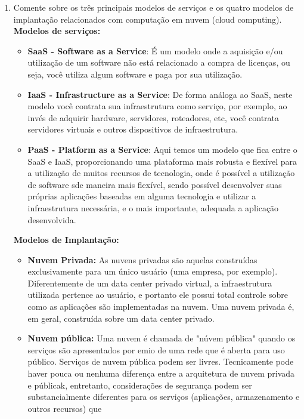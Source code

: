 \documentclass[10pt]{article}
\begin{document}
\begin{enumerate}
    \item Comente sobre os três principais modelos de serviços e os quatro modelos
    de implantação relacionados com computação em nuvem (cloud computing).
    \textbf{Modelos de serviços: }
    \begin{itemize}
        \item \textbf{SaaS - Software as a Service}:
        É um modelo onde a aquisição e/ou utilização de um software não está 
        relacionado a compra de licenças, ou seja, você utiliza algum software e 
        paga por sua utilização. 
        \item \textbf{IaaS - Infrastructure as a Service}:
        De forma análoga ao SaaS, neste modelo você contrata sua infraestrutura
        como serviço, por exemplo, ao invés de adquirir hardware, servidores,
        roteadores, etc, você contrata servidores virtuais e outros dispositivos
        de infraestrutura.
        \item \textbf{PaaS - Platform as a Service}:
        Aqui temos um modelo que fica entre o SaaS e IaaS, proporcionando uma
        plataforma mais robusta e flexível para a utilização de muitos recursos
        de tecnologia, onde é possível a utilização de software sde maneira mais 
        flexível, sendo possível desenvolver suas próprias aplicações baseadas
        em alguma tecnologia e utilizar a infraestrutura necessária, e o mais
        importante, adequada a aplicação desenvolvida.
    \end{itemize}
    \textbf{Modelos de Implantação:}
    \begin{itemize}
        \item \textbf{Nuvem Privada:} As nuvens privadas são aquelas construídas
        exclusivamente para um único usuário (uma empresa, por exemplo). 
        Diferentemente de um data center privado virtual, a infraestrutura utilizada
        pertence ao usuário, e portanto ele possui total controle sobre como as 
        aplicações são implementadas na nuvem. Uma nuvem privada é, em geral,
        construída sobre um data center privado.
        \item \textbf{Nuvem pública:} Uma nuvem é chamada de "núvem pública" quando
        os serviços são apresentados por emio de uma rede que é aberta para uso 
        público. Serviços de nuvem pública podem ser livres. Tecnicamente pode
        haver pouca ou nenhuma diferença entre a arquitetura de nuvem privada e
        públicak, entretanto, considerações de segurança podem ser substancialmente
        diferentes para os serviços (aplicações, armazenamento e outros recursos) que

\end{itemize}
\end{enumerate}
\end{document}
